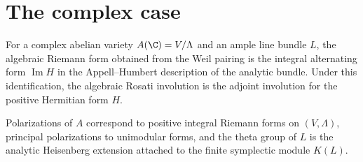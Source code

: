 \section[Complex comparison]{The complex case}
\label{mumford-IV24}

\begin{theorem}
\label{mumford-thm-riemann-comparison}
For a complex abelian variety $A(\C)=V/\Lambda$ and an ample line bundle $L$,
the algebraic Riemann form obtained from the Weil pairing is the integral
alternating form $\operatorname{Im}H$ in the Appell--Humbert description of the
analytic bundle.  Under this identification, the algebraic Rosati involution
is the adjoint involution for the positive Hermitian form $H$.
\notready
\end{theorem}

\begin{corollary}
\label{mumford-cor-complex-polarization-dictionary}
Polarizations of $A$ correspond to positive integral Riemann forms on
$(V,\Lambda)$, principal polarizations to unimodular forms, and the theta
group of $L$ is the analytic Heisenberg extension attached to the finite
symplectic module $K(L)$.
\notready
\end{corollary}
